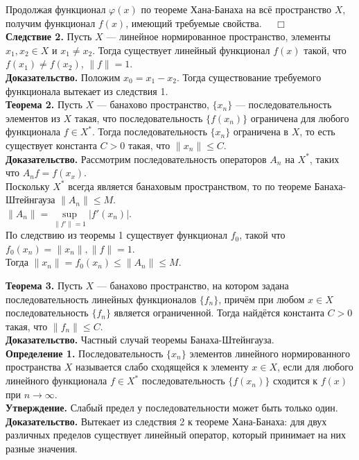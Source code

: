 \documentclass[12pt,a4paper, titlepage]{article}
\begin{document}
Продолжая функционал $\varphi(x)$ по теореме Хана-Банаха на всё пространство $X$, получим функционал $f(x)$, имеющий требуемые свойства. $\quad \Box$\\

\textbf{Следствие 2.} Пусть $X$ --- линейное нормированное пространство, элементы $x_1, x_2 \in X$ и $x_1 \neq x_2$. Тогда существует линейный функционал $f(x)$ такой, что $f(x_1) \neq f(x_2)$, $\|f\| = 1$.\\
\textbf{Доказательство.} Положим $x_0 = x_1 - x_2$. Тогда существование требуемого функционала вытекает из следствия 1.\\

\textbf{Теорема 2.}
Пусть $X$ --- банахово пространство, $\lbrace x_n\rbrace$ --- последовательность элементов из $X$ такая, что последовательность $\lbrace f(x_n)\rbrace$ ограничена для любого функционала $f \in X^*$. Тогда последовательность $\lbrace x_n\rbrace$ ограничена в $X$, то есть существует константа $C > 0$ такая, что $\|x_n\| \leqslant C$.\\
\textbf{Доказательство.} Рассмотрим последовательность операторов $A_n$ на $X^*$, таких что $A_nf = f(x_x)$.\\
Поскольку $X^*$ всегда является банаховым пространством, то по теореме Банаха-Штейнгауза $\|A_n\| \leqslant M$. \\
$\|A_n\| = \sup\limits_{\|f'\| = 1}|f'(x_n)|$. \\
По следствию из теоремы 1 существует функционал $f_0$, такой что $f_0(x_n) = \|x_n\|, \|f\| = 1$. \\
Тогда $\|x_n\| = f_0(x_n) \leqslant \|A_n\| \leqslant M$.

\textbf{Теорема 3.} Пусть $X$ --- банахово пространство, на котором задана последовательность линейных функционалов $\lbrace f_n \rbrace$, причём при любом $x \in X$ последовательность $\lbrace f_n \rbrace$ является ограниченной. Тогда найдётся константа $C > 0$ такая, что $\|f_n\| \leqslant C$. \\
\textbf{Доказательство.} Частный случай теоремы Банаха-Штейнгауза.\\

\textbf{Определение 1.} Последовательность $\lbrace x_n \rbrace$ элементов линейного нормированного пространства $X$ называется слабо сходящейся к элементу $x \in X$, если для любого линейного функционала $f \in X^*$ последовательность $\lbrace f(x_n) \rbrace$ сходится к $f(x)$ при $n\to\infty$.\\

\textbf{Утверждение.} Слабый предел у последовательности может быть только один. \\
\textbf{Доказательство.} Вытекает из следствия 2 к теореме Хана-Банаха: для двух различных пределов существует линейный оператор, который принимает на них разные значения. \\
\end{document}
